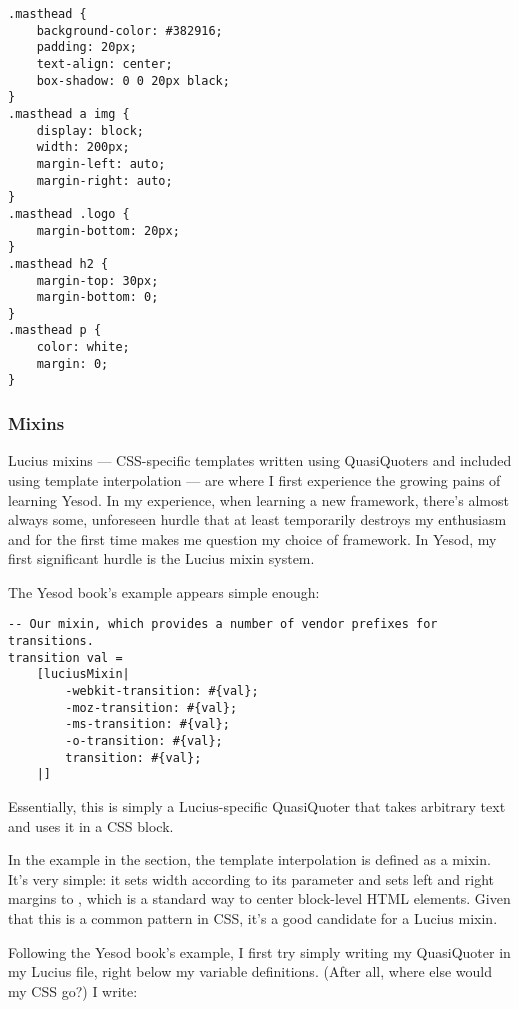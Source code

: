 \begin{Verbatim}
.masthead {
    background-color: #382916;
    padding: 20px;
    text-align: center;
    box-shadow: 0 0 20px black;
}
.masthead a img {
    display: block;
    width: 200px;
    margin-left: auto;
    margin-right: auto;
}
.masthead .logo {
    margin-bottom: 20px;
}
.masthead h2 {
    margin-top: 30px;
    margin-bottom: 0;
}
.masthead p {
    color: white;
    margin: 0;
}
\end{Verbatim}

\subsubsection{Mixins} \label{luciusMixins}

Lucius mixins --- CSS-specific templates written using QuasiQuoters and included using template interpolation --- are where I first experience the growing pains of learning Yesod. In my experience, when learning a new framework, there's almost always some, unforeseen hurdle that at least temporarily destroys my enthusiasm and for the first time makes me question my choice of framework. In Yesod, my first significant hurdle is the Lucius mixin system. 

The Yesod book's example \cite{ybkShakes} appears simple enough:

\begin{Verbatim}
-- Our mixin, which provides a number of vendor prefixes for transitions.
transition val =
    [luciusMixin|
        -webkit-transition: #{val};
        -moz-transition: #{val};
        -ms-transition: #{val};
        -o-transition: #{val};
        transition: #{val};
    |]
\end{Verbatim}

Essentially, this is simply a Lucius-specific QuasiQuoter that takes arbitrary text and uses it in a CSS block. 

In the example in the  section, the template interpolation  is defined as a mixin. It's very simple: it sets width according to its  parameter and sets left and right margins to , which is a standard way to center block-level HTML elements. Given that this is a common pattern in CSS, it's a good candidate for a Lucius mixin. 

Following the Yesod book's example, I first try simply writing my QuasiQuoter in my Lucius file, right below my variable definitions. (After all, where else would my CSS go?) I write:

